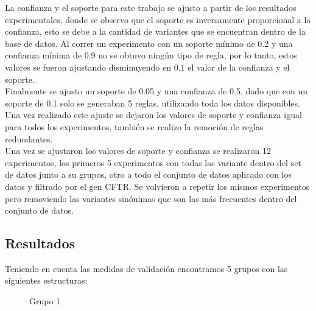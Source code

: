 La confianza y el soporte para este trabajo se ajusto a partir de los resultados experimentales, donde se observo que el soporte es inversamente proporcional a la confianza, esto se debe a la cantidad de variantes que se encuentran dentro de la base de datos. Al correr un experimento con un soporte mínimo de 0.2 y una confianza mínima de 0.9 no se obtuvo ningún tipo de regla, por lo tanto, estos valores se fueron ajustando disminuyendo en 0.1 el valor de la confianza y el soporte.\\

Finalmente se ajusto un soporte de 0.05 y una confianza de 0.5, dado que con un soporte de 0.1 solo se generaban 5 reglas, utilizando toda los datos disponibles. Una vez realizado este ajuste se dejaron los valores de soporte y confianza igual para todos los experimentos, también se realizo la remoción de reglas redundantes.\\

Una vez se ajustaron los valores de soporte y confianza se realizaron 12 experimentos, los primeros 5 experimentos con todas las variante dentro del set de datos junto a su grupos, otro a todo el conjunto de datos aplicado con los datos y filtrado por el gen CFTR. Se volvieron a repetir los mismos experimentos pero removiendo las variantes sinónimas que son las más frecuentes dentro del conjunto de datos.


\subsection{Resultados} 

Teniendo en cuenta las medidas de validación encontramos  5 grupos con las siguientes estructuras:

\begin{figure}[H]
	\centering
	\caption{Grupo 1}
	\label{f:grupo11}
\end{figure} 


